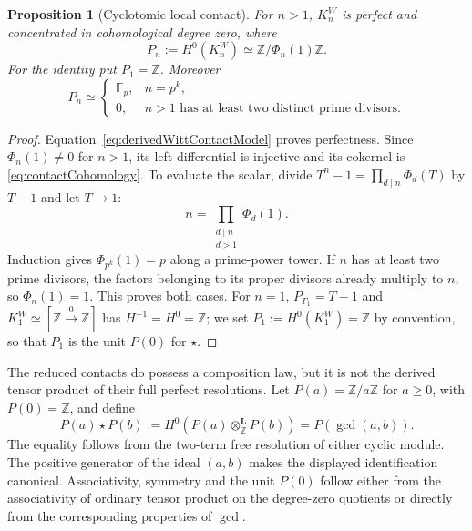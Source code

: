 \documentclass[11pt]{amsart}
\newtheorem{proposition}[theorem]{Proposition}
\theoremstyle{definition}
\theoremstyle{remark}
\newcommand{\Z}{\mathbb Z}
\begin{document}
\begin{proposition}[Cyclotomic local contact]
\label{prop:cyclotomicFixedContact}
For $n>1$, $K_n^W$ is perfect and concentrated in cohomological degree
zero, where
\begin{equation}\label{eq:contactCohomology}
 P_n:=H^0(K_n^W)\simeq\Z/\Phi_n(1)\Z.
\end{equation}
For the identity put $P_1=\Z$.  Moreover
\begin{equation}\label{eq:cyclotomicAtOne}
 P_n\simeq
 \begin{cases}
  \mathbb F_p,&n=p^k,\\
  0,&n>1\text{ has at least two distinct prime divisors}.
 \end{cases}
\end{equation}
\end{proposition}

\begin{proof}
Equation~\eqref{eq:derivedWittContactModel} proves perfectness.  Since
$\Phi_n(1)\ne0$ for $n>1$, its left differential is injective and its
cokernel is \eqref{eq:contactCohomology}.  To evaluate the scalar, divide
$T^n-1=\prod_{d\mid n}\Phi_d(T)$ by $T-1$ and let $T\to1$:
\[
 n=\prod_{\substack{d\mid n\\d>1}}\Phi_d(1).
\]
Induction gives $\Phi_{p^k}(1)=p$ along a prime-power tower.  If $n$ has
at least two prime divisors, the factors belonging to its proper divisors
already multiply to $n$, so $\Phi_n(1)=1$.  This proves both cases.
For $n=1$, $P_{\Gamma_1}=T-1$ and $K_1^W\simeq[\Z\xrightarrow0\Z]$ has
$H^{-1}=H^0=\Z$; we set $P_1:=H^0(K_1^W)=\Z$ by convention, so that $P_1$ is
the unit $P(0)$ for $\star$.
\end{proof}

The reduced contacts do possess a composition law, but it is not the
derived tensor product of their full perfect resolutions.  Let
$P(a)=\Z/a\Z$ for $a\geq0$, with $P(0)=\Z$, and define
\begin{equation}\label{eq:reducedContactProduct}
 P(a)\star P(b):=
 H^0\!\left(P(a)\mathbin{\otimes_\Z^{\mathbf L}}P(b)\right)
 =P(\gcd(a,b)).
\end{equation}
The equality follows from the two-term free resolution of either cyclic
module.  The positive generator of the ideal $(a,b)$ makes the displayed
identification canonical.  Associativity, symmetry and the unit $P(0)$
follow either from the associativity of ordinary tensor product on the
degree-zero quotients or directly from the corresponding properties of
$\gcd$.
\end{document}
